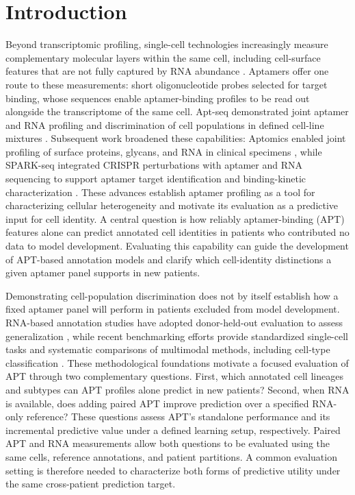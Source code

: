 \section{Introduction}

Beyond transcriptomic profiling, single-cell technologies increasingly measure complementary molecular layers within the same cell, including cell-surface features that are not fully captured by RNA abundance \citep{stoeckius2017simultaneous, hao2021integrated}. Aptamers offer one route to these measurements: short oligonucleotide probes selected for target binding, whose sequences enable aptamer-binding profiles to be read out alongside the transcriptome of the same cell. Apt-seq demonstrated joint aptamer and RNA profiling and discrimination of cell populations in defined cell-line mixtures \citep{delley2018combined}. Subsequent work broadened these capabilities: Aptomics enabled joint profiling of surface proteins, glycans, and RNA in clinical specimens \citep{wu2025high}, while SPARK-seq integrated CRISPR perturbations with aptamer and RNA sequencing to support aptamer target identification and binding-kinetic characterization \citep{luo2026spark}. These advances establish aptamer profiling as a tool for characterizing cellular heterogeneity and motivate its evaluation as a predictive input for cell identity. A central question is how reliably aptamer-binding (APT) features alone can predict annotated cell identities in patients who contributed no data to model development. Evaluating this capability can guide the development of APT-based annotation models and clarify which cell-identity distinctions a given aptamer panel supports in new patients.


Demonstrating cell-population discrimination does not by itself establish how a fixed aptamer panel will perform in patients excluded from model development. RNA-based annotation studies have adopted donor-held-out evaluation to assess generalization \citep{fischer2024sctab}, while recent benchmarking efforts provide standardized single-cell tasks and systematic comparisons of multimodal methods, including cell-type classification \citep{luecken2025defining,liu2025multitask}. These methodological foundations motivate a focused evaluation of APT through two complementary questions. First, which annotated cell lineages and subtypes can APT profiles alone predict in new patients? Second, when RNA is available, does adding paired APT improve prediction over a specified RNA-only reference? These questions assess APT’s standalone performance and its incremental predictive value under a defined learning setup, respectively. Paired APT and RNA measurements allow both questions to be evaluated using the same cells, reference annotations, and patient partitions. A common evaluation setting is therefore needed to characterize both forms of predictive utility under the same cross-patient prediction target.

